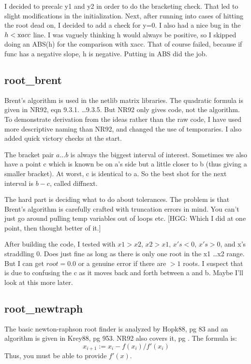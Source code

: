 I decided to precalc y1 and y2 in order to do the bracketing
check.  That led to slight modifications in the
initialization.  Next, after running into cases of hitting
the root dead on, I decided to add a check for y=0.  I also
had a nice bug in the $h < {\mbox xacc}$ line.  I was vaguely thinking h
would always be positive, so I skipped doing an ABS(h) for
the comparison with xacc.  That of course failed, because if
func has a negative slope, h is negative.  Putting in ABS
did the job.


\subsection*{root\_brent}
Brent's algorithm is used in the netlib matrix libraries.
The quadratic formula is given in NR92, eqn 9.3.1. \dots 9.3.5.
But NR92 only gives code, not the algorithm.  To demonstrate
derivation from the ideas rather than the raw code, I have
used more descriptive naming than NR92, and changed the use
of temporaries.  I also added quick victory checks at the
start.

The bracket pair $a \dots b$ is always the biggest interval of
interest.  Sometimes we also have a point c which is known
be on a's side but a little closer to b (thus giving a
smaller bracket).  At worst, c is identical to a.  So the
best shot for the next interval is $b-c$, called diffnext.

The hard part is deciding what to do about tolerances.  The
problem is that Brent's algorithm is carefully crafted with
truncation errors in mind.  You can't just go around pulling
temp variables out of loops etc. [HGG: Which I did at one point,
then thought better of it.]

After building the code, I tested with $x1>x2$, $x2>x1$, $x's <0$,
$x's > 0$, and x's straddling 0.  Does just fine as long as
there is only one root in the x1 \dots x2 range.  But I can get
$root=0.0$ or a genuine error if there are $>1$ roots.  I
suspect that is due to confusing the c as it moves back and
forth between a and b.  Maybe I'll look at this more later.


\subsection*{root\_newtraph}
The basic newton-raphson root finder is analyzed by Hopk88,
pg 83 and an algorithm is given in Krey88, pg 953.  NR92
also covers it, pg .  The formula is:
\begin{equation}    
  x_{i+1}:=x_i-f(x_i)/f'(x_i)
\end{equation}
Thus, you must be able to provide $f'(x)$.

